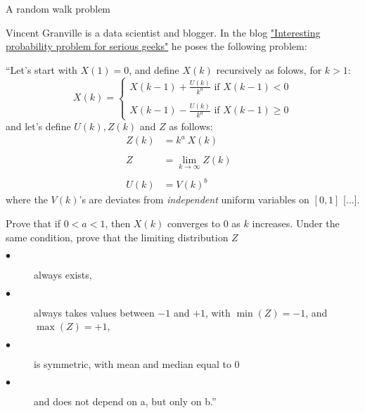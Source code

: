 \documentclass[12pt]{article}
\begin{document}
\begin{abstract}
	A random walk $\{X_n\}_{n \ge 1}\}$ on the line, having steps scaled by $n^{-a}$ ($0 < a <1$) of signs controlled towards $0$ does converge to $0$. The re-scaled walk $Z_n = n^a X_n$ converges in distribution to a random variable $Z$. Unlike the case of walks with identically distributed steps, the distribution of $Z$ is not normal, and depends on the distribution of the steps.  
\end{abstract}

\begin{section}{A random walk problem}  
\label{sec:intro}
	
\hspace{20pt}Vincent Granville is a data scientist and blogger. In the blog \href{https://www.analyticbridge.datasciencecentral.com/profiles/blogs/interesting-probability-problem-for-serious-geeks/}{"Interesting probability problem for serious geeks"} he poses the following problem: 

 ``Let's start with $X(1)=0$, and define $X(k)$ recursively as folows, for $k>1$:
 $$
	X(k) = \begin{cases*}
		X(k-1) + \frac{U(k)}{k^a} \text{ if $X(k-1) < 0$} \\
		\\
		X(k-1) - \frac{U(k)}{k^a} \text{ if $X(k-1) \ge 0$} 
		\end{cases*} 
$$
and let's define $U(k), Z(k)$ and $Z$ as follows:
\begin{align*}
Z(k) &= k^a \ X(k) &\\
&\ &\\
Z &= \lim_{k \rightarrow \infty} Z(k) &\\
&\ &\\
U(k) &= V(k)^b &
\end{align*}
where the $V(k)$'s are deviates from \textit{independent} uniform variables on $[0,1]$ [...].  

Prove that if $0<a<1$, then $X(k)$ converges to $0$ as $k$ increases. Under the same condition, prove that the limiting distribution $Z$ 
\begin{description}
	\item[$\bullet$ ] always exists,
	\item[$\bullet$ ] always takes values between $-1$ and $+1$, with $\min(Z) = -1$, and $\max(Z) = +1$,
	\item[$\bullet$ ] is symmetric, with mean and median equal to 0
	\item[$\bullet$ ] and does not depend on a, but only on b.'' 
\end{description}  


\end{section}
\end{document}
